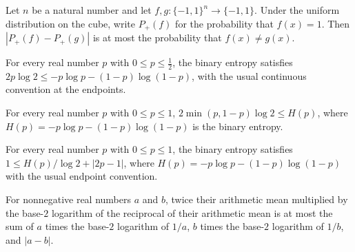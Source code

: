 \begin{theorem}
\label{FABL.abs_positiveProbability_sub_le_uniformProbability_ne}
\leanok
{}
Let $n$ be a natural number and let $f,g:\{−1,1\}^n\to\{−1,1\}$. Under the uniform
distribution on the cube, write $P_+(f)$ for the probability that $f(x)=1$. Then
$|P_+(f)-P_+(g)|$ is at most the probability that $f(x)\ne g(x)$.
\end{theorem}

\begin{theorem}
\label{FABL.two_mul_mul_log_two_le_binEntropy_of_le_half}
\leanok
{}
For every real number $p$ with $0\le p\le \tfrac12$, the binary entropy satisfies
$2p\log 2\le -p\log p-(1-p)\log(1-p)$, with the usual continuous convention at the
endpoints.
\end{theorem}

\begin{theorem}
\label{FABL.two_mul_min_mul_log_two_le_binEntropy}
\leanok
{}
For every real number $p$ with $0\le p\le1$, $2\min(p,1-p)\log 2\le H(p)$, where
$H(p)=-p\log p-(1-p)\log(1-p)$ is the binary entropy.
\end{theorem}

\begin{theorem}
\label{FABL.one_le_binEntropy_div_log_two_add_abs}
\leanok
{}
For every real number $p$ with $0\le p\le 1$, the binary entropy satisfies $1\le
H(p)/\log 2+|2p-1|$, where $H(p)=-p\log p-(1-p)\log(1-p)$ with the usual endpoint
convention.
\end{theorem}

\begin{theorem}
\label{FABL.two_mul_midpoint_mul_logb_inv_le}
\leanok
{}
For nonnegative real numbers $a$ and $b$, twice their arithmetic mean multiplied by the
base-$2$ logarithm of the reciprocal of their arithmetic mean is at most the sum of $a$
times the base-$2$ logarithm of $1/a$, $b$ times the base-$2$ logarithm of $1/b$, and
$|a-b|$.
\end{theorem}

